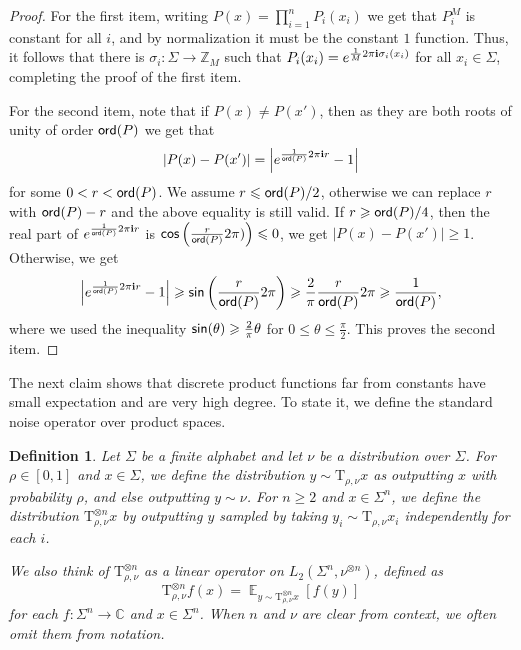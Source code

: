 \documentclass[11pt]{article}
\newtheorem{definition}[thm]{Definition}
\newcommand\card[1]{\left| {#1} \right|}
\newcommand\Expect[2]{{\mathop{\mathbb{E}}_{#1}\left[ {#2} \right]}}
\renewcommand\geq{\geqslant}
\renewcommand\leq{\leqslant}
\begin{document}
\begin{proof}
    For the first item, writing $P(x) = \prod\limits_{i=1}^{n}P_i(x_i)$ we get that $P_i^{M}$ is constant for all $i$, and by normalization it must be the constant $1$ function. Thus, it follows that there is $\sigma_i\colon \Sigma\to\mathbb{Z}_{M}$ such that 
    $P_i(x_i) = e^{\frac{1}{M}2\pi{\bf i}\sigma_i(x_i)}$ for all $x_i\in \Sigma$, completing the proof of the first item.

    For the second item, note that if $P(x)\neq P(x')$, then as they are both roots of unity of order ${\sf ord}(P)$ we get that
    \[
    \card{P(x)-P(x')}
    = 
    \card{e^{\frac{1}{{\sf ord}(P)}2\pi{\bf i}r}-1}
    \]
    for some $0<r<{\sf ord}(P)$.
    We assume $r\leq {\sf ord}(P)/2$, otherwise we can replace $r$ with ${\sf ord}(P)-r$ and the above equality is still valid. 
    If $r\geq {\sf ord}(P)/4$, then the real part of $e^{\frac{1}{{\sf ord}(P)}2\pi{\bf i}r}$ is 
    ${\sf cos}\left(\frac{r}{{\sf ord}(P)}2\pi)\right)\leq 0$, we get $\card{P(x)-P(x')}\geq 1$. Otherwise, we get
    \[
    \card{e^{\frac{1}{{\sf ord}(P)}2\pi{\bf i}r}-1}
    \geq {\sf sin}\left(\frac{r}{{\sf ord}(P)}2\pi\right)
    \geq \frac{2}{\pi} \frac{r}{{\sf ord}(P)}2\pi
    \geq \frac{1}{{\sf ord}(P)},
    \]
    where we used the inequality ${\sf sin}(\theta)\geq \frac{2}{\pi}\theta$ for $0\leq \theta\leq \frac{\pi}{2}$. This proves the second item.
\end{proof}
The next claim shows that discrete product functions far from constants have small expectation and are very high degree. To state it, we define the standard noise operator over product spaces.
\begin{definition}\label{def:noise_op}
    Let $\Sigma$ be a finite alphabet and let $\nu$ be a distribution over $\Sigma$. For $\rho\in [0,1]$ and $x\in \Sigma$, we define the distribution $y\sim\mathrm{T}_{\rho,\nu}x$ as outputting $x$ with probability $\rho$, and else outputting $y\sim \nu$. For $n\geq 2$ and $x\in\Sigma^n$, we define the distribution $\mathrm{T}_{\rho,\nu}^{\otimes n}x$ by outputting $y$ sampled by taking $y_i\sim \mathrm{T}_{\rho,\nu} x_i$ independently for each $i$.

    We also think of $\mathrm{T}_{\rho,\nu}^{\otimes n}$ as a linear operator on $L_2(\Sigma^n, \nu^{\otimes n})$, defined as
    \[
    \mathrm{T}_{\rho,\nu}^{\otimes n} f(x)
    =\Expect{y\sim \mathrm{T}_{\rho,\nu}^{\otimes n}x}{f(y)}
    \]
    for each $f\colon \Sigma^n\to\mathbb{C}$ and $x\in\Sigma^n$. When $n$ and $\nu$ are clear from context, we often omit them from notation.
\end{definition}
\end{document}
